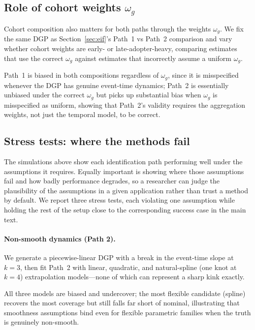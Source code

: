 \documentclass{article}
\begin{document}
\subsection{Role of cohort weights \texorpdfstring{$\omega_g$}{omega\_g}}

Cohort composition also matters for both paths through the weights $\omega_g$. We fix the same DGP as Section~\ref{sec:eif}'s Path~1 vs Path~2 comparison and vary whether cohort weights are early- or late-adopter-heavy, comparing estimates that use the correct $\omega_g$ against estimates that incorrectly assume a uniform $\omega_g$.

Path~1 is biased in both compositions regardless of $\omega_g$, since it is misspecified whenever the DGP has genuine event-time dynamics; Path~2 is essentially unbiased under the correct $\omega_g$ but picks up substantial bias when $\omega_g$ is misspecified as uniform, showing that Path~2's validity requires the aggregation weights, not just the temporal model, to be correct.

\subsection{Stress tests: where the methods fail}\label{sec:stress-tests}

The simulations above show each identification path performing well under the assumptions it requires. Equally important is showing where those assumptions fail and how badly performance degrades, so a researcher can judge the plausibility of the assumptions in a given application rather than trust a method by default. We report three stress tests, each violating one assumption while holding the rest of the setup close to the corresponding success case in the main text.

\paragraph{Non-smooth dynamics (Path 2).} We generate a piecewise-linear DGP with a break in the event-time slope at $k=3$, then fit Path~2 with linear, quadratic, and natural-spline (one knot at $k=4$) extrapolation models---none of which can represent a sharp kink exactly.

All three models are biased and undercover; the most flexible candidate (spline) recovers the most coverage but still falls far short of nominal, illustrating that smoothness assumptions bind even for flexible parametric families when the truth is genuinely non-smooth.
\end{document}
